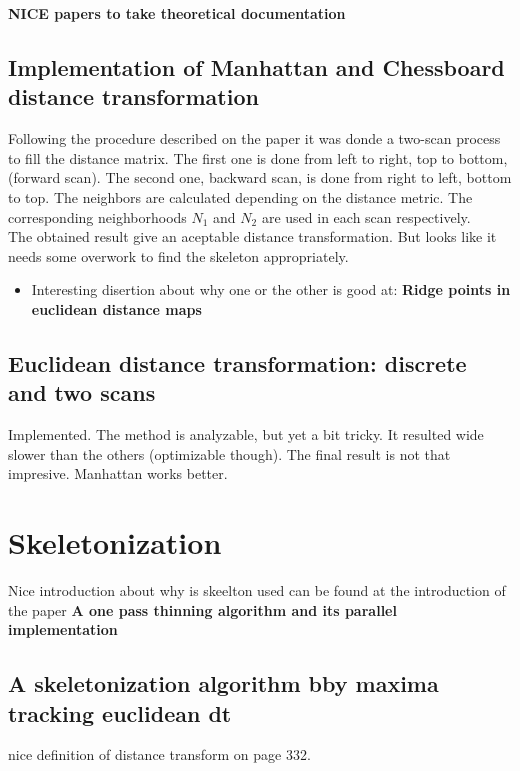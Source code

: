 \documentclass{article}
\begin{document}
\textbf{NICE papers to take theoretical documentation}

\subsection{Implementation of Manhattan and Chessboard distance transformation}
Following the procedure described on the paper it was donde a two-scan process
to fill the distance matrix. The first one is done from left to right, top to bottom,
(forward scan). The second one, backward scan, is done from right to left, bottom to top.
The neighbors are calculated depending on the distance metric. The corresponding 
neighborhoods $N_1$ and $N_2$ are used in each scan respectively.\\

The obtained result give an aceptable distance transformation. But looks like it
needs some overwork to find the skeleton appropriately.

\begin{itemize}
\item Interesting disertion about why one or the other is good at:
 \textbf{ Ridge points in euclidean distance maps}
\end{itemize}

\subsection{Euclidean distance transformation: discrete and two scans}

Implemented. The method is analyzable, but yet a bit tricky. It resulted
wide slower than the others (optimizable though). The final result is not that
impresive. Manhattan works better.


\section{Skeletonization}

Nice introduction about why is skeelton used can be found at the introduction
of the paper \textbf{A one pass thinning algorithm and its parallel
implementation}

\subsection{A skeletonization algorithm bby maxima tracking euclidean dt}

nice definition of distance transform on page 332.\\
\end{document}
